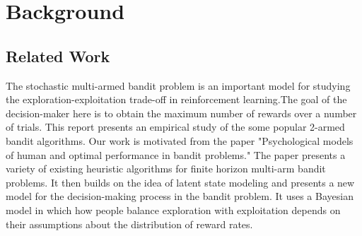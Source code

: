 \section{Background}
\label{background}

\subsection{Related Work}
The stochastic multi-armed bandit problem is an important model for studying the exploration-exploitation trade-off in reinforcement learning.The goal of the decision-maker here is to obtain the maximum number of rewards over a number of trials. This report presents an empirical study of the some popular 2-armed bandit algorithms. Our work is motivated from the paper "Psychological models of human and optimal performance in bandit problems." The paper presents a variety of existing heuristic algorithms for finite horizon multi-arm bandit problems. It then builds on the idea of latent state modeling and presents a new model for the decision-making process in the bandit problem. It uses a Bayesian model in which how people balance exploration with exploitation depends on their assumptions about the distribution of reward rates. 

 